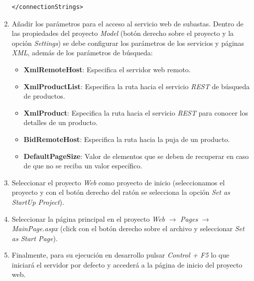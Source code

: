 \documentclass{article}
\begin{document}
\begin{enumerate}
\begin{lstlisting}[style=xml]
</connectionStrings>
\end{lstlisting}

	\item Añadir los parámetros para el acceso al servicio web de subastas. Dentro de las propiedades del proyecto \emph{Model} (botón derecho sobre el proyecto y la opción \emph{Settings}) se debe configurar los parámetros de los servicios y páginas \emph{XML}, además de los parámetros de búsqueda:
	\begin{itemize}
		\item \textbf{XmlRemoteHost}: Especifica el servidor web remoto.
		\item \textbf{XmlProductList}: Especifica la ruta hacia el servicio \emph{REST} de búsqueda de productos.
		\item \textbf{XmlProduct}: Especifica la ruta hacia el servicio \emph{REST} para conocer los detalles de un producto.
		\item \textbf{BidRemoteHost}: Especifica la ruta hacia la puja de un producto.
		\item \textbf{DefaultPageSize}: Valor de elementos que se deben de recuperar en caso de que no se reciba un valor específico.
	\end{itemize}

	\item Seleccionar el proyecto \emph{Web} como proyecto de inicio (seleccionamos el proyecto y con el botón derecho del ratón se selecciona la opción \emph{Set as StartUp Project}).
	
	\item Seleccionar la página principal en el proyecto \emph{Web} $\rightarrow$ \emph{Pages} $\rightarrow$ \emph{MainPage.aspx} (click con el botón derecho sobre el archivo y seleccionar \emph{Set as Start Page}).
	
	\item Finalmente, para su ejecución en desarrollo pulsar \emph{Control + F5} lo que iniciará el servidor por defecto y accederá a la página de inicio del proyecto web.
\end{enumerate}


\clearpage
\newpage
\listoffigures
\end{document}
